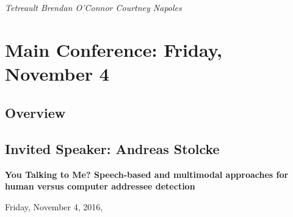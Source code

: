 






\newpage
\section[Plenary Session: Half Minute Madness B]{}
\bigskip{}
 \hfill \emph{ {Tetreault} {Brendan} {O'Connor} {Courtney} {Napoles} }\par
{}\par
\bigskip{}

%
%


\chapter{Main Conference: Friday, November 4}
\thispagestyle{emptyheader}
\section*{Overview}

\clearpage{}


\section{Invited Speaker: Andreas Stolcke}

\begin{center}
\textbf{\Large{}You Talking to Me? Speech-based and multimodal approaches for human versus computer addressee detection}{\Large{}\vspace{1em}
}
\par\end{center}{\Large \par}

\begin{center}
Friday, November 4, 2016,  \vspace{1em}
\\
 \PlenaryLoc \\
 \vspace{1em}

\par\end{center}

